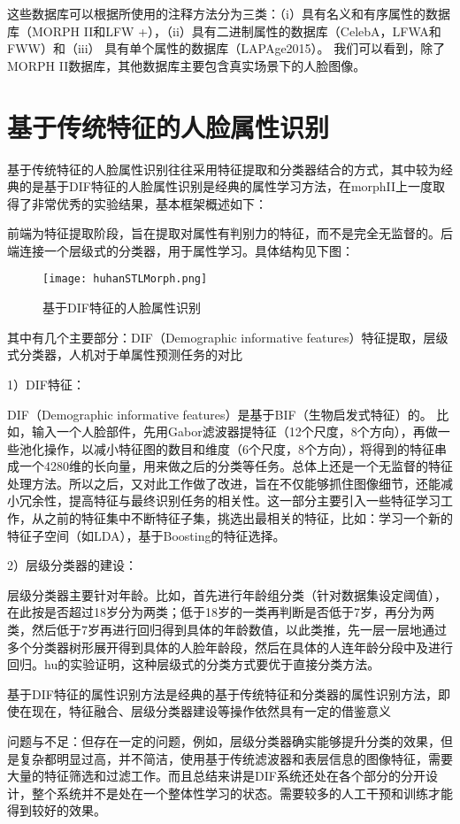 这些数据库可以根据所使用的注释方法分为三类：（i）具有名义和有序属性的数据库（MORPH II和LFW +），（ii）具有二进制属性的数据库（CelebA，LFWA和FWW）和（iii） 具有单个属性的数据库（LAPAge2015）。 我们可以看到，除了MORPH II数据库，其他数据库主要包含真实场景下的人脸图像。  

\section{基于传统特征的人脸属性识别}
基于传统特征的人脸属性识别往往采用特征提取和分类器结合的方式，其中较为经典的是基于DIF特征的人脸属性识别是经典的属性学习方法，在morphII上一度取得了非常优秀的实验结果，基本框架概述如下：

前端为特征提取阶段，旨在提取对属性有判别力的特征，而不是完全无监督的。后端连接一个层级式的分类器，用于属性学习。具体结构见下图：
\begin{figure}[!ht]
 \centering
	\texttt{[image: huhanSTLMorph.png]}
	\caption{基于DIF特征的人脸属性识别}
\end{figure}

其中有几个主要部分：DIF（Demographic informative features）特征提取，层级式分类器，人机对于单属性预测任务的对比

1）DIF特征：

DIF（Demographic informative features）是基于BIF（生物启发式特征）的。
比如，输入一个人脸部件，先用Gabor滤波器提特征（12个尺度，8个方向），再做一些池化操作，以减小特征图的数目和维度（6个尺度，8个方向），将得到的特征串成一个4280维的长向量，用来做之后的分类等任务。总体上还是一个无监督的特征处理方法。所以之后，又对此工作做了改进，旨在不仅能够抓住图像细节，还能减小冗余性，提高特征与最终识别任务的相关性。这一部分主要引入一些特征学习工作，从之前的特征集中不断特征子集，挑选出最相关的特征，比如：学习一个新的特征子空间（如LDA），基于Boosting的特征选择。

2）层级分类器的建设：

层级分类器主要针对年龄。比如，首先进行年龄组分类（针对数据集设定阈值），在此按是否超过18岁分为两类；低于18岁的一类再判断是否低于7岁，再分为两类，然后低于7岁再进行回归得到具体的年龄数值，以此类推，先一层一层地通过多个分类器树形展开得到具体的人脸年龄段，然后在具体的人连年龄分段中及进行回归。hu的实验证明，这种层级式的分类方式要优于直接分类方法。

基于DIF特征的属性识别方法是经典的基于传统特征和分类器的属性识别方法，即使在现在，特征融合、层级分类器建设等操作依然具有一定的借鉴意义

问题与不足：但存在一定的问题，例如，层级分类器确实能够提升分类的效果，但是复杂都明显过高，并不简洁，使用基于传统滤波器和表层信息的图像特征，需要大量的特征筛选和过滤工作。而且总结来讲是DIF系统还处在各个部分的分开设计，整个系统并不是处在一个整体性学习的状态。需要较多的人工干预和训练才能得到较好的效果。

